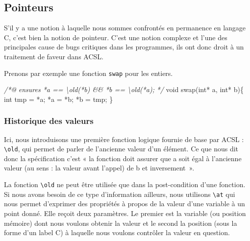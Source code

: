 \documentclass[12pt,francais,]{scrbook}
\newenvironment{Shaded}{}{}
\newcommand{\DataTypeTok}[1]{\textcolor[rgb]{0.56,0.13,0.00}{{#1}}}
\newcommand{\CommentTok}[1]{\textcolor[rgb]{0.38,0.63,0.69}{\textit{{#1}}}}
\newcommand{\NormalTok}[1]{{#1}}
\begin{document}
\subsection{Pointeurs}\label{pointeurs}

S'il y a une notion à laquelle nous sommes confrontés en permanence en
langage C, c'est bien la notion de pointeur. C'est une notion complexe
et l'une des principales cause de bugs critiques dans les programmes,
ils ont donc droit à un traitement de faveur dans ACSL.

Prenons par exemple une fonction \texttt{swap} pour les entiers.

\clearpage

\begin{footnotesize}\begin{Shaded}
\begin{Highlighting}[]
\CommentTok{/*@}
\CommentTok{  ensures *a == \textbackslash{}old(*b) && *b == \textbackslash{}old(*a);}
\CommentTok{*/}
\DataTypeTok{void} \NormalTok{swap(}\DataTypeTok{int}\NormalTok{* a, }\DataTypeTok{int}\NormalTok{* b)\{}
  \DataTypeTok{int} \NormalTok{tmp = *a;}
  \NormalTok{*a = *b;}
  \NormalTok{*b = tmp;}
\NormalTok{\}}
\end{Highlighting}
\end{Shaded}\end{footnotesize}

\subsubsection{Historique des valeurs}\label{historique-des-valeurs}

Ici, nous introduisons une première fonction logique fournie de base par
ACSL : \texttt{\textbackslash{}old}, qui permet de parler de l'ancienne
valeur d'un élément. Ce que nous dit donc la spécification c'est « la
fonction doit assurer que a soit égal à l'ancienne valeur (au sens : la
valeur avant l'appel) de b et inversement~».

La fonction \texttt{\textbackslash{}old} ne peut être utilisée que dans
la post-condition d'une fonction. Si nous avons besoin de ce type
d'information ailleurs, nous utilisons \texttt{\textbackslash{}at} qui
nous permet d'exprimer des propriétés à propos de la valeur d'une
variable à un point donné. Elle reçoit deux paramètres. Le premier est
la variable (ou position mémoire) dont nous voulons obtenir la valeur et
le second la position (sous la forme d'un label C) à laquelle nous
voulons contrôler la valeur en question.
\end{document}
